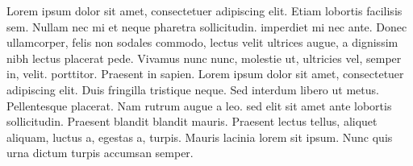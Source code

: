 \documentclass{memoir}
\begin{document}
\beginnumbering
\pstart
Lorem ipsum dolor sit amet, consectetuer adipiscing elit. Etiam
lobortis facilisis sem. Nullam nec mi et neque pharetra
sollicitudin.  imperdiet mi nec ante. Donec ullamcorper,
felis non sodales commodo, lectus velit ultrices augue, a
dignissim nibh lectus placerat pede. Vivamus nunc nunc, molestie
ut, ultricies vel, semper in, velit.  porttitor. Praesent in
sapien. Lorem ipsum dolor sit amet, consectetuer adipiscing elit.
Duis fringilla tristique neque. Sed interdum libero ut metus.
Pellentesque placerat. Nam rutrum augue a leo. \textbf{} sed elit sit
amet ante lobortis sollicitudin. Praesent blandit blandit mauris.
Praesent lectus tellus, aliquet aliquam, luctus a, egestas a,
turpis. Mauris lacinia lorem sit ipsum. Nunc quis urna dictum
turpis accumsan semper.
\pend
\endnumbering
\printglossary
\end{document}
